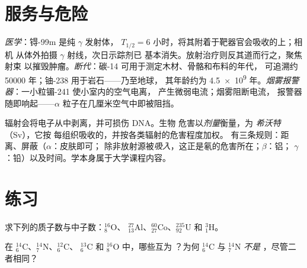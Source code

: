 \section{服务与危险}

\begin{example}[不稳定原子核的三种用途]\label{ex:g11:nucleus-radioactivity:uses}
\emph{医学}：锝-99m 是纯 $\gamma$ 发射体，
$T_{1/2} = 6$ 小时，将其附着于靶器官会吸收的上；相机
从体外拍摄 $\gamma$ 射线，次日示踪剂已
基本消失。放射治疗则反其道而行之，聚焦射束
以摧毁肿瘤。\emph{断代}：碳-14 可用于测定木材、骨骼和布料的年代，
可追溯约 \num{50000} 年；铀-238 用于岩石——乃至地球，
其年龄约为 \num{4.5e9} 年。\emph{烟雾报警器}：一小粒镅-241 使小室内的空气电离，
产生微弱电流；烟雾阻断电流，
报警器随即响起——$\alpha$ 粒子在几厘米空气中即被阻挡。
\end{example}

\begin{remark}[剂量与希沃特]\label{rem:g11:nucleus-radioactivity:dose}
辐射会将电子从中剥离，并可损伤 DNA。生物
危害以\emph{剂量}衡量，为
\emph{希沃特}（\unit{Sv}），它按
每组织吸收的，并按各类辐射的危害程度加权。
有三条规则：距离、屏蔽（$\alpha$：皮肤即可；
除非放射源被\emph{吸入}，这正是氡的危害所在；$\beta$：铝；
$\gamma$：铅）以及时间。学本身属于大学课程内容。
\end{remark}

\section{练习}

\begin{exercise}[$\star$]\label{exo:g11:nucleus-radioactivity:1}
求下列的质子数与中子数：${}^{16}_{8}\mathrm{O}$、
${}^{27}_{13}\mathrm{Al}$、${}^{60}_{27}\mathrm{Co}$、${}^{235}_{92}\mathrm{U}$
和 ${}^{3}_{1}\mathrm{H}$。
\end{exercise}

\begin{exercise}[$\star$]\label{exo:g11:nucleus-radioactivity:2}
在 ${}^{14}_{6}\mathrm{C}$、${}^{14}_{7}\mathrm{N}$、${}^{12}_{6}\mathrm{C}$、
${}^{13}_{6}\mathrm{C}$ 和 ${}^{16}_{8}\mathrm{O}$ 中，哪些互为
？为何 ${}^{14}_{6}\mathrm{C}$ 与 ${}^{14}_{7}\mathrm{N}$ \emph{不是}
，尽管二者相同？
\end{exercise}

